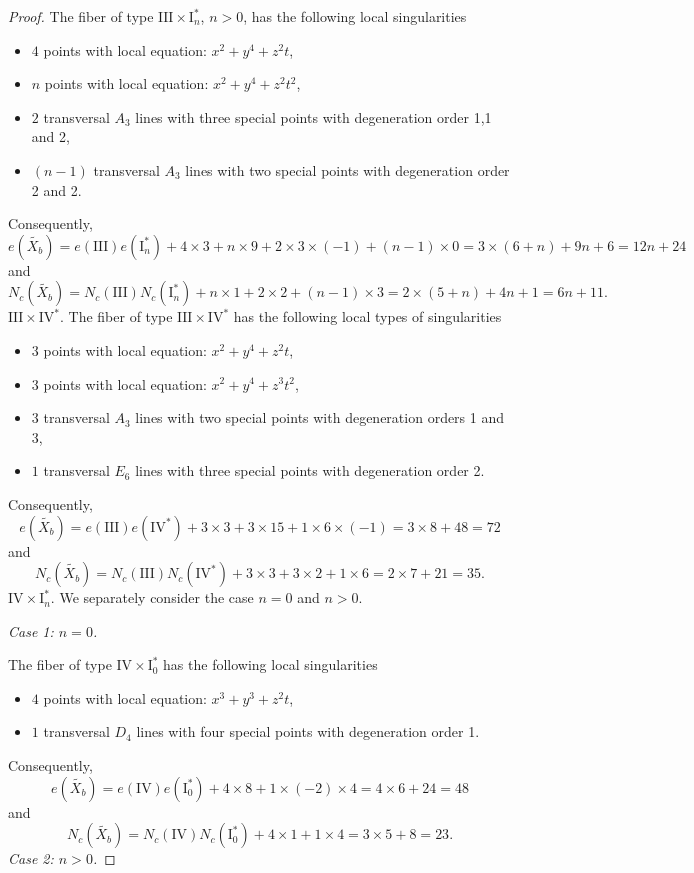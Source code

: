 \documentclass[a4paper]{amsart}
\theoremstyle{plain}
\theoremstyle{definition}
\theoremstyle{remark}
\numberwithin{equation}{section}
\begin{document}
\begin{proof}
The fiber of type $\mathrm{III} \times \mathrm{I}_{n}^{*}$, $n>0$, has the following local singularities
\begin{itemize}
	\item [] $4$ points with local equation: $x^{2}+y^{4}+z^{2}t$,
	\item [] $n$ points with local equation: $x^{2}+y^{4}+z^{2}t^{2}$,
	\item [] $2$ transversal $A_{3}$ lines with three  special points with degeneration order 1,1 and 2,
	\item [] $(n-1)$ transversal $A_{3}$ lines with two special points with degeneration order 2 and 2.
\end{itemize}
Consequently,
\[
e(\widetilde{X_{b}}) = e(\mathrm{III})e(\mathrm{I}_{n}^{*}) + 4\times 3 + n\times9 +2 \times 3\times (-1) + (n-1)\times 0 = 3\times (6+n) + 9n+6=12n+24
\]
and
\[
N_{c}(\widetilde{X_{b}}) = N_{c}(\mathrm{III})N_{c}(\mathrm{I}_{n}^{*}) + n\times 1 + 2 \times 2 + (n-1) \times 3 = 2\times (5 + n) + 4n +1 = 6n+11.
\]
\medskip
\noindent\emph{$\mathrm{III} \times \mathrm{IV}^{*}$}.
The fiber of type $\mathrm{III} \times \mathrm{IV}^{*}$ has the following local types of singularities
\begin{itemize}
	\item [] $3$ points with local equation: $x^{2}+y^{4}+z^{2}t$,
	\item [] $3$ points with local equation: $x^{2}+y^{4}+z^{3}t^{2}$,
	\item [] $3$ transversal $A_{3}$ lines with two special points with degeneration orders 1 and 3,
	\item [] $1$ transversal $E_{6}$ lines with three special points with degeneration order 2.
\end{itemize}
Consequently,
\[
e(\widetilde{X_{b}}) = e(\mathrm{III})e(\mathrm{IV}^{*}) + 3\times3 + 3 \times 15 + 1\times 6  \times (-1) =
3\times 8 + 48 = 72
\]
and
\[
N_{c}(\widetilde{X_{b}}) = N_{c}(\mathrm{III})N_{c}(\mathrm{IV}^{*}) +  3\times 3 +  3 \times 2 +1\times 6= 2\times 7 + 21 = 35.
\]
\medskip
\noindent\emph{$\mathrm{IV} \times \mathrm{I}_{n}^{*}$}.
We separately consider the case $n=0$ and $n>0$.

\medskip
\noindent
\emph{Case 1: $n=0$.}

The fiber of type $\mathrm{IV} \times \mathrm{I}_{0}^{*}$ has the following local singularities
\begin{itemize}
	\item [] $4$ points with local equation: $x^{3}+y^{3}+z^{2}t$,
	\item [] $1$ transversal $D_{4}$ lines with four  special points with degeneration order 1.
\end{itemize}
Consequently,
\[
e(\widetilde{X_{b}}) = e(\mathrm{IV})e(\mathrm{I}_{0}^{*}) + 4\times8 + 1\times(-2)\times 4 = 4\times 6 + 24 = 48
\]
and
\[
N_{c}(\widetilde{X_{b}}) = N_{c}(\mathrm{IV})N_{c}(\mathrm{I}_{0}^{*}) + 4\times 1+ 1\times 4  = 3\times 5 + 8  = 23.
\]
\medskip
\noindent
\emph{Case 2: $n>0$.}


\end{proof}
\end{document}
